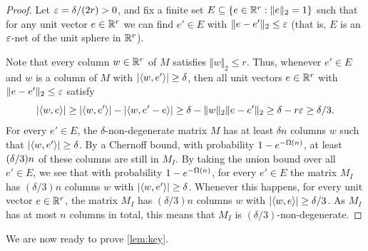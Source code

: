 \documentclass{daj}
\theoremstyle{plain}
\theoremstyle{plain}
\theoremstyle{plain}
\theoremstyle{plain}
\theoremstyle{definition}
\theoremstyle{plain}
\theoremstyle{plain}
\theoremstyle{definition}
\theoremstyle{definition}
\theoremstyle{plain}
\let\originalleft\left
\let\originalright\right
\renewcommand{\left}{\mathopen{}\mathclose\bgroup\originalleft}
\renewcommand{\right}{\aftergroup\egroup\originalright}
\begin{document}
\begin{proof}
Let $\varepsilon=\delta/(2r)>0$, and fix a finite set $E\subseteq \lbrace e\in \mathbb{R}^r: \Vert e\Vert_2=1\rbrace$ such that for any unit vector $e\in \mathbb{R}^r$ we can find $e'\in E$ with $\Vert e-e'\Vert_2\leq \varepsilon$ (that is, $E$ is an $\varepsilon$-net of the unit sphere in $\mathbb{R}^r$).

Note that every column $w\in \mathbb{R}^r$ of $M$ satisfies $\Vert w\Vert_2\leq r$. Thus, whenever $e'\in E$ and $w$ is a column of $M$ with $\left|\left\langle w,e'\right\rangle \right|\ge\delta$, then all unit vectors $e\in \mathbb{R}^r$ with $\Vert e-e'\Vert_2\leq \varepsilon$ satisfy
\[\left|\left\langle w,e\right\rangle \right|\geq 
\left|\left\langle w,e'\right\rangle \right|-\left|\left\langle w,e'-e\right\rangle \right|\geq
\delta-\Vert w\Vert_2 \Vert e-e'\Vert_2\geq \delta - r\eps\geq \delta/3.\]
For every $e'\in E$, the $\delta$-non-degenerate matrix $M$ has at least $\delta n$ columns $w$ such that $\left|\left\langle w, e'\right\rangle \right|\ge\delta$. By a Chernoff bound, with probability $1-e^{-\Omega\left(n\right)}$, at least $\left(\delta/3\right)n$ of these columns are still in $M_{I}$. By taking the union bound over all $e'\in E$, we see that with probability $1-e^{-\Omega\left(n\right)}$, for every $e'\in E$ the matrix $M_I$ has $(\delta/3) n$ columns $w$ with $\left|\left\langle w,e'\right\rangle \right|\ge\delta$. Whenever this happens, for every unit vector $e\in \mathbb{R}^r$, the matrix $M_I$ has $(\delta/3) n$ columns $w$ with $\left|\left\langle w,e\right\rangle \right|\ge\delta/3$. As $M_I$ has at most $n$ columns in total, this means that $M_I$ is $(\delta/3)$-non-degenerate.
\end{proof}

We are now ready to prove \cref{lem:key}.
\end{document}
